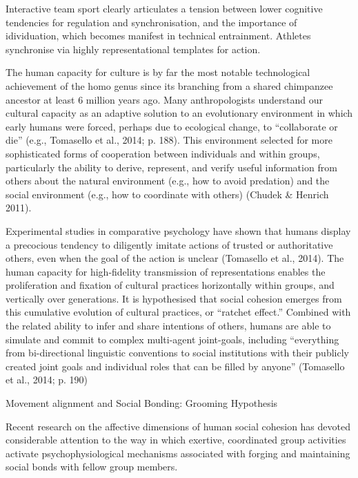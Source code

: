 \documentclass[12pt]{report}
\begin{document}
Interactive team sport clearly articulates a tension between lower cognitive tendencies for regulation and synchronisation, and the importance of idividuation, which becomes manifest in technical entrainment.  Athletes synchronise via highly representational templates for action.

The human capacity for culture is by far the most notable technological achievement of the homo genus since its branching from a shared chimpanzee ancestor at least 6 million years ago. Many anthropologists understand our cultural capacity as an adaptive solution to an evolutionary environment in which early humans were forced, perhaps due to ecological change, to “collaborate or die” (e.g., Tomasello et al., 2014; p. 188).  This environment selected for more sophisticated forms of cooperation between individuals and within groups, particularly the ability to derive, represent, and verify useful information from others about the natural environment (e.g., how to avoid predation) and the social environment (e.g., how to coordinate with others) (Chudek & Henrich 2011).

Experimental studies in comparative psychology have shown that humans display a precocious tendency to diligently imitate actions of trusted or authoritative others, even when the goal of the action is unclear (Tomasello et al., 2014).  The human capacity for high-fidelity transmission of representations enables the proliferation and fixation of cultural practices horizontally within groups, and vertically over generations. It is hypothesised that social cohesion emerges from this cumulative evolution of cultural practices, or “ratchet effect.” Combined with the related ability to infer and share intentions of others, humans are able to simulate and commit to complex multi-agent joint-goals, including “everything from bi-directional linguistic conventions to social institutions with their publicly created joint goals and individual roles that can be filled by anyone”  (Tomasello et al., 2014; p. 190)

 Movement alignment and Social Bonding: Grooming Hypothesis

 Recent research on the affective dimensions of human social cohesion has devoted considerable attention to the way in which exertive, coordinated group activities activate psychophysiological mechanisms associated with forging and maintaining social bonds with fellow group members.
\end{document}
